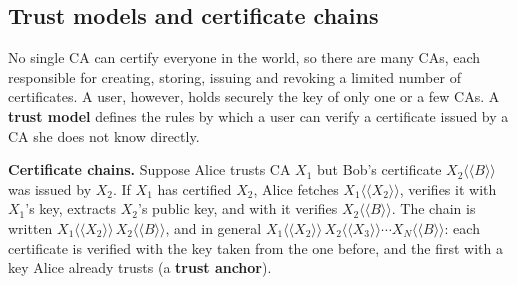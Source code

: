 \subsection{Trust models and certificate chains \new}

No single CA can certify everyone in the world, so there are many CAs, each responsible for creating, storing, issuing and revoking a limited number of certificates. A user, however, holds securely the key of only one or a few CAs. A \textbf{trust model} defines the rules by which a user can verify a certificate issued by a CA she does not know directly.

\textbf{Certificate chains.} Suppose Alice trusts CA $X_1$ but Bob's certificate $X_2\langle\!\langle B \rangle\!\rangle$ was issued by $X_2$. If $X_1$ has certified $X_2$, Alice fetches $X_1\langle\!\langle X_2 \rangle\!\rangle$, verifies it with $X_1$'s key, extracts $X_2$'s public key, and with it verifies $X_2\langle\!\langle B \rangle\!\rangle$. The chain is written $X_1\langle\!\langle X_2 \rangle\!\rangle\, X_2\langle\!\langle B \rangle\!\rangle$, and in general $X_1\langle\!\langle X_2 \rangle\!\rangle\, X_2\langle\!\langle X_3 \rangle\!\rangle \cdots X_N\langle\!\langle B \rangle\!\rangle$: each certificate is verified with the key taken from the one before, and the first with a key Alice already trusts (a \textbf{trust anchor}).
